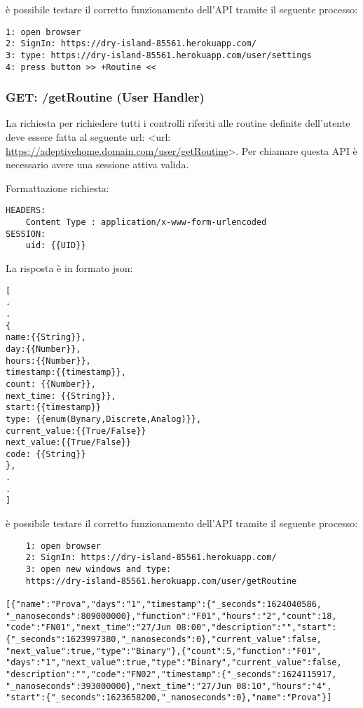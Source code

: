 \documentclass[onecolumn,a4paper]{article}
\begin{document}
è possibile testare il corretto funzionamento dell'API tramite il seguente processo:

\begin{verbatim}
1: open browser
2: SignIn: https://dry-island-85561.herokuapp.com/
3: type: https://dry-island-85561.herokuapp.com/user/settings
4: press button >> +Routine <<  
\end{verbatim}
\subsubsection{GET: /getRoutine (User Handler)}
\label{sec:orgf3b34b5}
La richiesta per richiedere tutti i controlli riferiti alle routine definite dell'utente deve essere fatta al seguente url: <url: \url{https://adeptivehome.domain.com/user/getRoutine}>. Per chiamare questa API è necessario avere una sessione attiva valida. 

Formattazione richiesta:

\begin{verbatim}
HEADERS:
    Content Type : application/x-www-form-urlencoded
SESSION:
    uid: {{UID}}

\end{verbatim}

La risposta è in formato json: 

\begin{verbatim}
[
.
.
{
name:{{String}},
day:{{Number}},
hours:{{Number}},
timestamp:{{timestamp}},
count: {{Number}},
next_time: {{String}},
start:{{timestamp}}
type: {{enum(Bynary,Discrete,Analog)}},
current_value:{{True/False}}
next_value:{{True/False}}
code: {{String}}
},
.
.
]
\end{verbatim}

è possibile testare il corretto funzionamento dell'API tramite il seguente processo:

\begin{verbatim}
    1: open browser
    2: SignIn: https://dry-island-85561.herokuapp.com/
    3: open new windows and type:
    https://dry-island-85561.herokuapp.com/user/getRoutine

[{"name":"Prova","days":"1","timestamp":{"_seconds":1624040586,
"_nanoseconds":809000000},"function":"F01","hours":"2","count":18,
"code":"FN01","next_time":"27/Jun 08:00","description":"","start":
{"_seconds":1623997380,"_nanoseconds":0},"current_value":false,
"next_value":true,"type":"Binary"},{"count":5,"function":"F01",
"days":"1","next_value":true,"type":"Binary","current_value":false,
"description":"","code":"FN02","timestamp":{"_seconds":1624115917,
"_nanoseconds":393000000},"next_time":"27/Jun 08:10","hours":"4",
"start":{"_seconds":1623658200,"_nanoseconds":0},"name":"Prova"}]

\end{verbatim}
\end{document}
